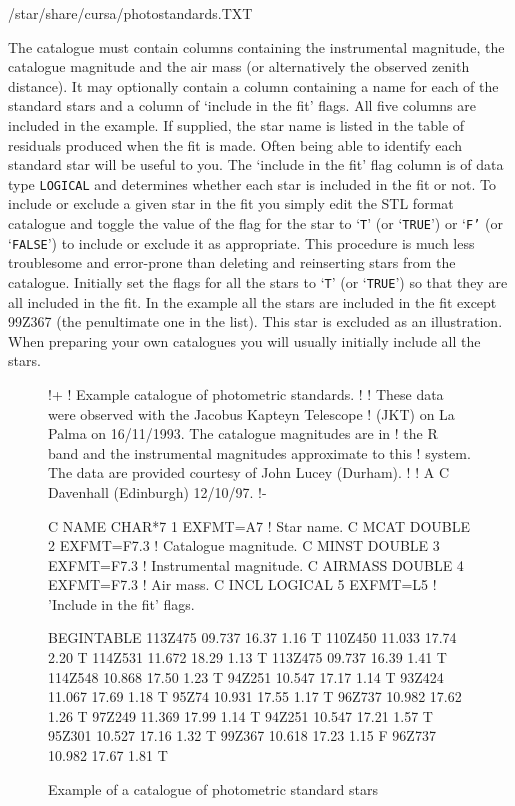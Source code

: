 \documentclass[twoside,11pt]{starlink}
\begin{document}
\begin{terminalv}
/star/share/cursa/photostandards.TXT
\end{terminalv}

The catalogue must contain columns containing the instrumental magnitude,
the catalogue magnitude and the air mass (or alternatively the observed
zenith distance).  It may optionally contain a column containing a name
for each of the standard stars and a column of `include in the fit'
flags.  All five columns are included in the example.  If supplied, the
star name is listed in the table of residuals produced when the fit is
made.  Often being able to identify each standard star will be useful
to you.  The `include in the fit' flag column is of data type \texttt{LOGICAL} and determines whether each star is included in the fit or
not.  To include or exclude a given star in the fit you simply edit
the STL format catalogue and toggle the value of the flag for the
star to `\texttt{T}' (or `\texttt{TRUE}') or `\texttt{F'} (or `\texttt{FALSE}') to
include or exclude it as appropriate.  This procedure is much less
troublesome and error-prone than deleting and reinserting stars from
the catalogue.  Initially set the flags for all the stars to `\texttt{T}'
(or `\texttt{TRUE}') so that they are all included in the fit.  In the
example all the stars are included in the fit except 99Z367 (the
penultimate one in the list).  This star is excluded as an illustration.
When preparing your own catalogues you will usually initially include all
the stars.

\begin{figure}[htbp]

\begin{terminalv}
!+
! Example catalogue of photometric standards.
!
! These data were observed with the Jacobus Kapteyn Telescope
! (JKT) on La Palma on 16/11/1993.  The catalogue magnitudes are in
! the R band and the instrumental magnitudes approximate to this
! system.  The data are provided courtesy of John Lucey (Durham).
!
! A C Davenhall (Edinburgh) 12/10/97.
!-

C NAME    CHAR*7  1  EXFMT=A7    ! Star name.
C MCAT    DOUBLE  2  EXFMT=F7.3  ! Catalogue magnitude.
C MINST   DOUBLE  3  EXFMT=F7.3  ! Instrumental magnitude.
C AIRMASS DOUBLE  4  EXFMT=F7.3  ! Air mass.
C INCL    LOGICAL 5  EXFMT=L5    ! 'Include in the fit' flags.

BEGINTABLE
113Z475  09.737  16.37  1.16  T
110Z450  11.033  17.74  2.20  T
114Z531  11.672  18.29  1.13  T
113Z475  09.737  16.39  1.41  T
114Z548  10.868  17.50  1.23  T
 94Z251  10.547  17.17  1.14  T
 93Z424  11.067  17.69  1.18  T
 95Z74   10.931  17.55  1.17  T
 96Z737  10.982  17.62  1.26  T
 97Z249  11.369  17.99  1.14  T
 94Z251  10.547  17.21  1.57  T
 95Z301  10.527  17.16  1.32  T
 99Z367  10.618  17.23  1.15  F
 96Z737  10.982  17.67  1.81  T
\end{terminalv}

\caption{Example of a catalogue of photometric standard stars
\label{PHOTOSTDCAT} }

\end{figure}
\end{document}
